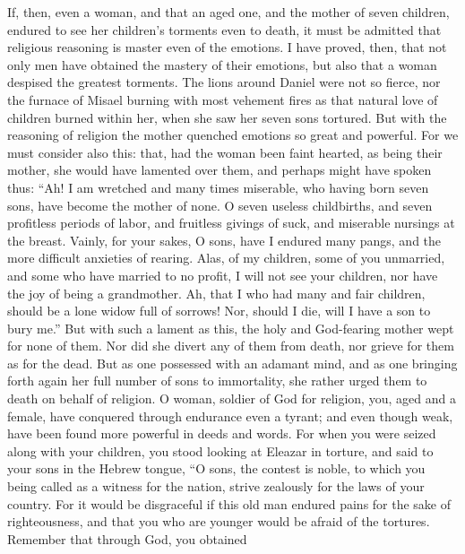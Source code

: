  If, then, even a woman, and that an aged one, and the
mother of seven children, endured to see her children's torments even to
death, it must be admitted that religious reasoning is master even of
the emotions.  I have proved, then, that not only men have
obtained the mastery of their emotions, but also that a woman despised
the greatest torments.  The lions around Daniel were not so
fierce, nor the furnace of Misael burning with most vehement fires as
that natural love of children burned within her, when she saw her seven
sons tortured.  But with the reasoning of religion the
mother quenched emotions so great and powerful.  For we must
consider also this: that, had the woman been faint hearted, as being
their mother, she would have lamented over them, and perhaps might have
spoken thus:  ``Ah! I am wretched and many times miserable,
who having born seven sons, have become the mother of none. 
O seven useless childbirths, and seven profitless periods of labor, and
fruitless givings of suck, and miserable nursings at the breast.
 Vainly, for your sakes, O sons, have I endured many pangs,
and the more difficult anxieties of rearing.  Alas, of my
children, some of you unmarried, and some who have married to no profit,
I will not see your children, nor have the joy of being a grandmother.
 Ah, that I who had many and fair children, should be a
lone widow full of sorrows!  Nor, should I die, will I have
a son to bury me.'' But with such a lament as this, the holy and
God-fearing mother wept for none of them.  Nor did she
divert any of them from death, nor grieve for them as for the dead.
 But as one possessed with an adamant mind, and as one
bringing forth again her full number of sons to immortality, she rather
urged them to death on behalf of religion.  O woman,
soldier of God for religion, you, aged and a female, have conquered
through endurance even a tyrant; and even though weak, have been found
more powerful in deeds and words.  For when you were seized
along with your children, you stood looking at Eleazar in torture, and
said to your sons in the Hebrew tongue,  ``O sons, the
contest is noble, to which you being called as a witness for the nation,
strive zealously for the laws of your country.  For it
would be disgraceful if this old man endured pains for the sake of
righteousness, and that you who are younger would be afraid of the
tortures.  Remember that through God, you obtained

